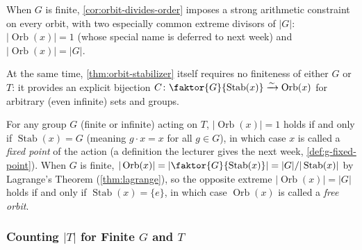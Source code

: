 \begin{insight}
When $G$ is finite, \cref{cor:orbit-divides-order} imposes a strong arithmetic constraint on every orbit, with two especially common extreme divisors of $|G|$: $|\operatorname{Orb}(x)| = 1$ (whose special name is deferred to next week) and $|\operatorname{Orb}(x)| = |G|$.

At the same time, \cref{thm:orbit-stabilizer} itself requires no finiteness of either $G$ or $T$: it provides an explicit bijection $C \colon \faktor{G}{\operatorname{Stab}(x)} \xrightarrow{\sim} \operatorname{Orb}(x)$ for arbitrary (even infinite) sets and groups.
\end{insight}

\begin{aiNote}
For any group $G$ (finite or infinite) acting on $T$, $|\operatorname{Orb}(x)| = 1$ holds if and only if $\operatorname{Stab}(x) = G$ (meaning $g \cdot x = x$ for all $g \in G$), in which case $x$ is called a \emph{fixed point} of the action (a definition the lecturer gives the next week, \cref{def:g-fixed-point}). When $G$ is finite, $|\operatorname{Orb}(x)| = \left| \faktor{G}{\operatorname{Stab}(x)} \right| = |G| / |\operatorname{Stab}(x)|$ by Lagrange's Theorem (\cref{thm:lagrange}), so the opposite extreme $|\operatorname{Orb}(x)| = |G|$ holds if and only if $\operatorname{Stab}(x) = \{e\}$, in which case $\operatorname{Orb}(x)$ is called a \emph{free orbit}.
\end{aiNote}

\subsubsection{Counting \texorpdfstring{$|T|$}{|T|} for Finite \texorpdfstring{$G$ and $T$}{G and T}}

